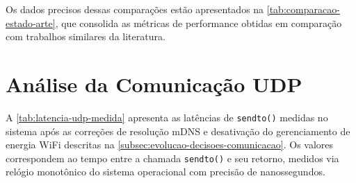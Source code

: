 Os dados precisos dessas comparações estão apresentados na \autoref{tab:comparacao-estado-arte}, que consolida as métricas de performance obtidas em comparação com trabalhos similares da literatura.

\begin{table}[!ht]
\captionsetup{width=16cm}
\end{table}

\section{Análise da Comunicação UDP}
\label{sec:comunicacao-udp}

A \autoref{tab:latencia-udp-medida} apresenta as latências de \texttt{sendto()} medidas no sistema após as correções de resolução \gls{mDNS} e desativação do gerenciamento de energia WiFi descritas na \autoref{subsec:evolucao-decisoes-comunicacao}. Os valores correspondem ao tempo entre a chamada \texttt{sendto()} e seu retorno, medidos via relógio monotônico do sistema operacional com precisão de nanossegundos.

